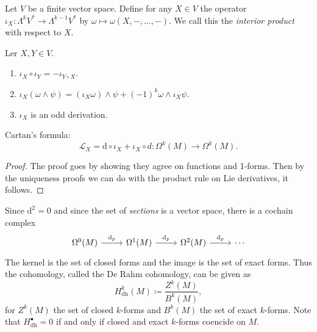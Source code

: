 \begin{definition}\label{skdsnjn}
	Let $V$ be a finite vector space. Define for any $X\in V$ the operator $\iota _X : \Lambda ^kV^* \to \Lambda ^{k-1} V^*$ by $\omega \mapsto  \omega (X,-, \ldots ,-)$. We call this the \emph{interior product} with respect to $X$.
\end{definition}

\begin{proposition}\label{properties}
	Ler $X,Y\in V$.
	\begin{enumerate}
		\item $\iota _X \circ \iota _Y = - \iota _{Y\circ X} $.
		\item $\iota _X(\omega \wedge \psi )=(\iota _X\omega )\wedge \psi +(-1)^k\omega \wedge \iota _X\psi $.
		\item $\iota _X$ is an odd derivation.
	\end{enumerate}
\end{proposition}

\begin{proposition}\label{askm}
	Cartan's formula:
	\[
		\mathcal{L} _X = \mathrm{d} \circ \iota _X + \iota _X\circ d : \Omega ^k(M)\to \Omega ^k(M)
	.\]
\end{proposition}
\begin{proof}
	The proof goes by showing they agree on functions and 1-forms. Then by the uniqueness proofs we can do with the product rule on Lie derivatives, it follows.
\end{proof}


\begin{construction}
	Since $\mathrm{d} ^2=0$ and since the set of \emph{sections} is a vector space, there is a cochain complex
	\[\begin{tikzcd}[row sep = 2.5em, column sep = 2.5em]
		\Omega^0(M) \ar[" \mathrm{d}_p ", r]  & \Omega^1(M)\ar[" \mathrm{d} _p ", r] & \Omega ^2(M)\ar[" \mathrm{d} _p ", r]  & \cdots
	\end{tikzcd}\]
	The kernel is the set of closed forms and the image is the set of exact forms. Thus the cohomology, called the De Rahm cohomology, can be given as
	\[
		H_{\mathrm{dh} } ^k(M)\coloneqq \frac{Z^k(M)}{B^k(M)} ,
	\]
	for $Z^k(M)$ the set of closed $k$-forms and $B^k(M)$ the set of exact $k$-forms. Note that $H_{\mathrm{dh} } ^{\bullet} =0$ if and only if closed and exact $k$-forms coencide on $M$.
\end{construction}

